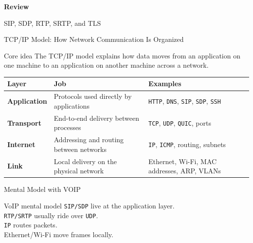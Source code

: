 \documentclass[aspectratio=169]{beamer}
\begin{document}
\begin{frame}
    \centering
    \vfill

    {\Huge \textbf{Review}}

    \vspace{0.4cm}

    {\Large SIP, SDP, RTP, SRTP, and TLS}

    \vfill
\end{frame}




\begin{frame}{TCP/IP Model: How Network Communication Is Organized}
\small

\begin{block}{Core idea}
The TCP/IP model explains how data moves from an application on one machine to an application on another machine across a network.
\end{block}

\vspace{0.2cm}

\begin{center}
\begin{tabular}{p{2.8cm} p{4.2cm} p{4.8cm}}
\toprule
\textbf{Layer} & \textbf{Job} & \textbf{Examples} \\
\midrule
\textbf{Application} & Protocols used directly by applications & \texttt{HTTP}, \texttt{DNS}, \texttt{SIP}, \texttt{SDP}, \texttt{SSH} \\
\textbf{Transport} & End-to-end delivery between processes & \texttt{TCP}, \texttt{UDP}, \texttt{QUIC}, ports \\
\textbf{Internet} & Addressing and routing between networks & \texttt{IP}, \texttt{ICMP}, routing, subnets \\
\textbf{Link} & Local delivery on the physical network & Ethernet, Wi-Fi, MAC addresses, ARP, VLANs \\
\bottomrule
\end{tabular}
\end{center}

\end{frame}

\begin{frame}{Mental Model with VOIP}

\begin{alertblock}{VoIP mental model}
\centering
\texttt{SIP/SDP} live at the application layer.  \\
\texttt{RTP/SRTP} usually ride over \texttt{UDP}.  \\
\texttt{IP} routes packets.  \\
Ethernet/Wi-Fi move frames locally.
\end{alertblock}

\end{frame}
\end{document}
